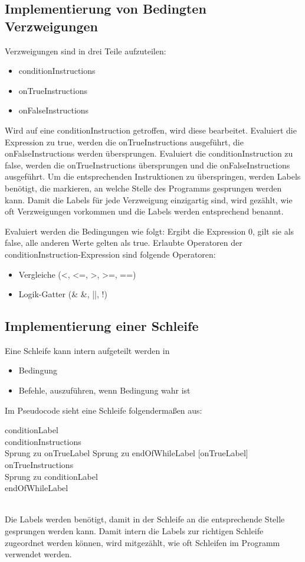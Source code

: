\subsection{Implementierung von Bedingten Verzweigungen}
Verzweigungen sind in drei Teile aufzuteilen:
\begin{itemize}
	\item conditionInstructions
	\item onTrueInstructions
	\item onFalseInstructions	
\end{itemize}

Wird auf eine conditionInstruction getroffen, wird diese bearbeitet.
Evaluiert die Expression zu true, werden die onTrueInstructions ausgeführt, die onFalseInstructions werden übersprungen. Evaluiert die conditionInstruction zu false, werden die onTrueInstructions übersprungen und die onFalseInstructions ausgeführt.
Um die entsprechenden Instruktionen zu überspringen, werden Labels benötigt, die markieren, an welche Stelle des Programms gesprungen werden kann. Damit die Labels für jede Verzweigung einzigartig sind, wird gezählt, wie oft Verzweigungen vorkommen und die Labels werden entsprechend benannt.

Evaluiert werden die Bedingungen wie folgt:
Ergibt die Expression 0, gilt sie als false, alle anderen Werte gelten als true.
Erlaubte Operatoren der conditionInstruction-Expression sind folgende Operatoren:
\begin{itemize}
	\item Vergleiche (<, <=, >, >=, ==)
	\item Logik-Gatter (\& \&, ||, !)
\end{itemize}

\subsection{Implementierung einer Schleife}
Eine Schleife kann intern aufgeteilt werden in
\begin{itemize}
\item Bedingung
\item Befehle, auszuführen, wenn Bedingung wahr ist
\end{itemize}

Im Pseudocode sieht eine Schleife folgendermaßen aus:
\\
\begin{algorithm}[H]
	conditionLabel \\
	conditionInstructions \\
		{ 
			Sprung zu onTrueLabel
		}
		{
			Sprung zu endOfWhileLabel
		}
	[onTrueLabel] \\
	onTrueInstructions \\
	Sprung zu conditionLabel \\	
	endOfWhileLabel
\end{algorithm}
\(\)\\
Die Labels werden benötigt, damit in der Schleife an die entsprechende Stelle gesprungen werden kann. Damit intern die Labels zur richtigen Schleife zugeordnet werden können, wird mitgezählt, wie oft Schleifen im Programm verwendet werden.


